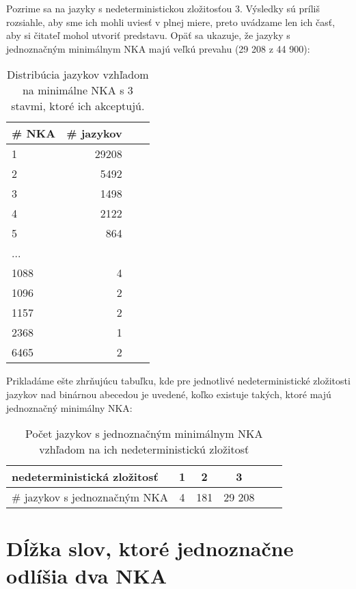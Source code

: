 Pozrime sa na jazyky s nedeterministickou zložitosťou 3. Výsledky sú príliš rozsiahle, aby sme ich mohli uviesť v plnej miere, preto uvádzame len ich časť, aby si čitateľ mohol utvoriť predstavu. Opäť sa ukazuje, že jazyky s jednoznačným minimálnym NKA majú veľkú prevahu (29 208 z 44 900): 

\begin{table}[H]
  \centering
  \resizebox{3cm}{!} {
  \begin{tabular}{|l|r|r|r|}
    \hline
    \# NKA & \# jazykov \\ 
    \hline
    1 & 29208 \\
    \hline
    2 & 5492 \\
    \hline
    3 & 1498 \\
    \hline
    4 & 2122 \\
    \hline
    5 & 864 \\
    \hline
    ... \\
    \hline
    1088 & 4 \\
    \hline
    1096 & 2 \\
    \hline
    1157 & 2 \\
    \hline
    2368 & 1 \\
    \hline
    6465 & 2 \\
    \hline
  \end{tabular}
  }
  \caption{Distribúcia jazykov vzhľadom na minimálne NKA s 3 stavmi, ktoré ich akceptujú.}
\end{table}

Prikladáme ešte zhrňujúcu tabuľku, kde pre jednotlivé nedeterministické zložitosti jazykov nad binárnou abecedou je uvedené, koľko existuje takých, ktoré majú jednoznačný minimálny NKA:

\begin{table}[h]
  \centering
  \begin{tabular}{|l|c|c|c|c|r|}
    \hline
    nedeterministická zložitosť & 1 & 2 & 3 \\ 
    \hline
    \# jazykov s jednoznačným NKA & 4 & 181 & 29 208 \\
    \hline
  \end{tabular}
  \caption{Počet jazykov s jednoznačným minimálnym NKA vzhľadom na ich nedeterministickú zložitosť}
\end{table}

\label{safeWordLength}
\section{Dĺžka slov, ktoré jednoznačne odlíšia dva NKA}

